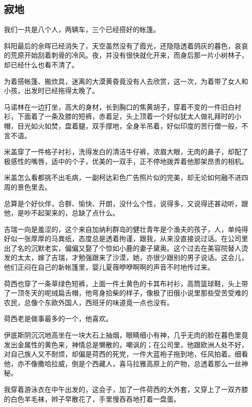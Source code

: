\subsection{寂地}

\par 我们一共是八个人，两辆车，三个已经搭好的帐篷。
\par 斜阳最后的余晖已经消失了，天空虽然没有了霞光，还隐隐透着鸽灰的暮色，哀哀的荒原开始刮着刺骨的冷风。夜，并没有很快就化开来，而身后那一片小树林子，却已经什么也看不清了。
\par 为着搭帐篷、搬炊具，迷离的大漠黄昏竟没有人去欣赏，这一次，为着带了女人和小孩，出发时已经拖得太晚了。
\par 马诺林在一边打坐，高大的身材，长到胸口的焦黄胡子，穿着不变的一件旧白衬衫，下面着了一条及膝的短裤，赤着足，头上顶着一个好似犹太人做礼拜时的小帽，目光如火如焚，盘着腿，双手撑地，全身半吊着，好似印度的苦行僧一般，不言不语。
\par 米盖穿了一件格子衬衫，洗得发白的清洁牛仔裤，浓眉大眼，无肉的鼻子，却配了极感性的嘴唇，适中的个子，优美的一双手，正不停地拨弄着他那架昂贵的相机。
\par 米盖怎么看都挑不出毛病，一副柯达彩色广告照片似的完美，却无论如何融不进四周的景色里去。
\par 总算是个好伙伴，合群、愉快、开朗，没什么个性，说得多，又说得还甚动听，跟他，是吵不起架来的，总缺了点什么。
\par 吉瑞一向是羞涩的，这个来自加纳利群岛的健壮青年是个渔夫的孩子，人，单纯得好似一张厚厚的马粪纸，态度总是透着拘谨，跟我，从来没直接说过话。在公司里出了名的沉默老实，偏偏又娶了个惊如小鹿的妻子黛奥。这个过去在美容院替人烫发的太太，嫁了吉瑞，才勉强跟来了沙漠，她，亦很少跟别的男子说话。这会儿，他们正闷在自己的新帐篷里，婴儿夏薇咿咿啊啊的声音不时地传过来。
\par 荷西也穿了一条草绿色短裤，上面一件土黄色的卡其布衬衫，高筒篮球鞋，头上带了一顶冬天的呢绒扁舌帽，他弯身拾柴的样子，像极了旧俄小说里那些受苦受难的农民，总像个东欧外国人，西班牙的味道竟一点也没有。
\par 荷西老是做事最多的一个，他喜欢。
\par 伊底斯阴沉沉地高坐在一块大石上抽烟，眼睛细小有神，几乎无肉的脸在暮色里竟发出金属性的黄色来，神情总是懒散的，嘲讽的；在公司里，他跟欧洲人处不好，对自己族人又不耐烦，却偏是荷西的死党，一件大蓝袍子拖到地，任风拍着。细看他，亦不像撒哈拉威，倒是个西藏人，喜马拉雅高原上的产物，总透着那么一丝神秘。
\par 我穿着游泳衣在中午出发的，这会子，加了一件荷西的大外套，又穿上了一双齐膝的白色羊毛袜，辫子早散花了，手里慢吞吞地打着一盘蛋。
